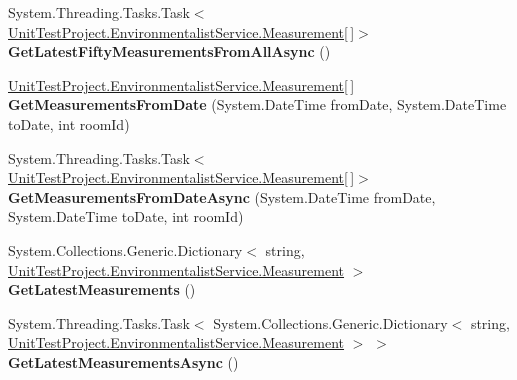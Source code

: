 \begin{DoxyCompactItemize}
\item 
\hypertarget{interface_unit_test_project_1_1_environmentalist_service_1_1_i_service1_ad0dccd8b27113fb45ddf7f41862cba2c}{}System.\+Threading.\+Tasks.\+Task$<$ \hyperlink{class_unit_test_project_1_1_environmentalist_service_1_1_measurement}{Unit\+Test\+Project.\+Environmentalist\+Service.\+Measurement}\mbox{[}$\,$\mbox{]}$>$ {\bfseries Get\+Latest\+Fifty\+Measurements\+From\+All\+Async} ()\label{interface_unit_test_project_1_1_environmentalist_service_1_1_i_service1_ad0dccd8b27113fb45ddf7f41862cba2c}

\item 
\hypertarget{interface_unit_test_project_1_1_environmentalist_service_1_1_i_service1_aec38f848953a8c2fe6ce37f5e32affad}{}\hyperlink{class_unit_test_project_1_1_environmentalist_service_1_1_measurement}{Unit\+Test\+Project.\+Environmentalist\+Service.\+Measurement}\mbox{[}$\,$\mbox{]} {\bfseries Get\+Measurements\+From\+Date} (System.\+Date\+Time from\+Date, System.\+Date\+Time to\+Date, int room\+Id)\label{interface_unit_test_project_1_1_environmentalist_service_1_1_i_service1_aec38f848953a8c2fe6ce37f5e32affad}

\item 
\hypertarget{interface_unit_test_project_1_1_environmentalist_service_1_1_i_service1_a0b460dc2cafcfb51a92ed18d1bc9e5e7}{}System.\+Threading.\+Tasks.\+Task$<$ \hyperlink{class_unit_test_project_1_1_environmentalist_service_1_1_measurement}{Unit\+Test\+Project.\+Environmentalist\+Service.\+Measurement}\mbox{[}$\,$\mbox{]}$>$ {\bfseries Get\+Measurements\+From\+Date\+Async} (System.\+Date\+Time from\+Date, System.\+Date\+Time to\+Date, int room\+Id)\label{interface_unit_test_project_1_1_environmentalist_service_1_1_i_service1_a0b460dc2cafcfb51a92ed18d1bc9e5e7}

\item 
\hypertarget{interface_unit_test_project_1_1_environmentalist_service_1_1_i_service1_ae3f87252ae5e50978979e8fb07dbd2be}{}System.\+Collections.\+Generic.\+Dictionary$<$ string, \hyperlink{class_unit_test_project_1_1_environmentalist_service_1_1_measurement}{Unit\+Test\+Project.\+Environmentalist\+Service.\+Measurement} $>$ {\bfseries Get\+Latest\+Measurements} ()\label{interface_unit_test_project_1_1_environmentalist_service_1_1_i_service1_ae3f87252ae5e50978979e8fb07dbd2be}

\item 
\hypertarget{interface_unit_test_project_1_1_environmentalist_service_1_1_i_service1_ac2dd114e1730839deeafa7fb153129cc}{}System.\+Threading.\+Tasks.\+Task$<$ System.\+Collections.\+Generic.\+Dictionary$<$ string, \hyperlink{class_unit_test_project_1_1_environmentalist_service_1_1_measurement}{Unit\+Test\+Project.\+Environmentalist\+Service.\+Measurement} $>$ $>$ {\bfseries Get\+Latest\+Measurements\+Async} ()\label{interface_unit_test_project_1_1_environmentalist_service_1_1_i_service1_ac2dd114e1730839deeafa7fb153129cc}


\end{DoxyCompactItemize}
